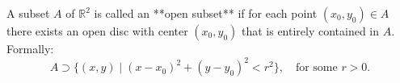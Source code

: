 A subset $A$ of $\mathbb{R}^2$ is called an **open subset** if for each point $(x_0, y_0) \in A$ there exists an open disc with center $(x_0, y_0)$ that is entirely contained in $A$. Formally:
$$
A \supset \{(x, y) \mid (x - x_0)^2 + (y - y_0)^2 < r^2\}, \quad \text{for some } r > 0.
$$
